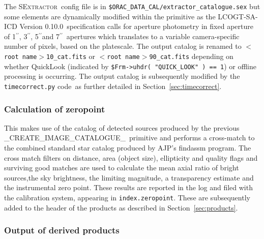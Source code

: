 \documentclass[twoside,11pt,nolof]{starlink}
\providecommand{\SEx}{\textsc{SExtractor}}
\providecommand{\task}[1]{\textsf{#1}}
\providecommand{\SAICD}{LCOGT-SA-ICD Version 0.10.0}
\providecommand{\Ast}{\texttt{timecorrect.py} code}
\providecommand{\arcsec}{\mbox{$^{\prime \prime}$}}
\begin{document}
The \SEx\ config file is in \texttt{\$ORAC\_DATA\_CAL/extractor\_catalogue.sex}
but some elements are dynamically modified within the primitive as the \SAICD\
specification calls for aperture photometry in fixed aperture of 1\arcsec,
3\arcsec, 5\arcsec and 7\arcsec\ apertures which translates to a variable
camera-specific number of pixels, based on the platescale. The output catalog is
renamed to \texttt{$<$root name$>$10\_cat.fits} or \texttt{$<$root
name$>$90\_cat.fits} depending on whether QuickLook (indicated by
\texttt{\$Frm->uhdr( "QUICK\_LOOK" ) == 1}) or offline processing is occurring.
The output catalog is subsequently modified by the \Ast\ as further detailed in
Section~\ref{sec:timecorrect}.

\subsubsection{Calculation of zeropoint}

This makes use of the catalog of detected sources produced by the previous
\task{\_CREATE\_IMAGE\_CATALOGUE\_}\ primitive and performs a cross-match to the
combined standard star catalog produced by AJP's \task{findassm} program. The
cross match filters on distance, area (object size), ellipticity and quality
flags and surviving good matches are used to calculate the mean axial ratio of
bright sources,the sky brightness, the limiting magnitude, a transparency
estimate and the instrumental zero point. These results are reported in the log
and filed with the calibration system, appearing in \texttt{index.zeropoint}.
These are subsequently added to the header of the products as described in
Section~\ref{sec:products}.

\subsubsection{Output of derived products}
\protect\label{sec:products}
\end{document}
